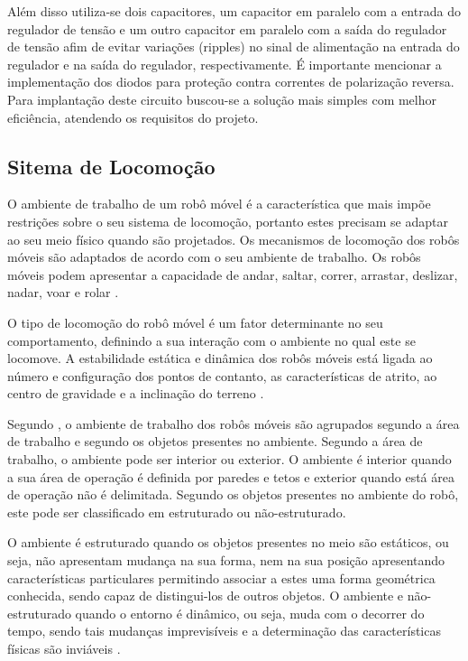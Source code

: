 Além disso utiliza-se dois capacitores, um capacitor em paralelo com a entrada do regulador de tensão e um outro capacitor em paralelo com a saída do regulador de tensão afim de evitar variações (ripples) no sinal de alimentação na entrada do regulador e na saída do regulador, respectivamente. É importante mencionar a implementação dos diodos para proteção contra correntes de polarização reversa. Para implantação deste circuito buscou-se a solução mais simples com melhor eficiência, atendendo os requisitos do projeto.

\subsection{Sitema de Locomoção}

O ambiente de trabalho de um robô móvel é a característica que mais impõe restrições sobre o seu sistema de locomoção, portanto estes
precisam se adaptar ao seu meio físico quando são projetados. Os mecanismos de locomoção dos robôs móveis são adaptados de acordo com
o seu ambiente de trabalho. Os robôs móveis podem apresentar a capacidade de andar, saltar, correr, arrastar, deslizar, nadar, voar
e rolar \cite{secchi:2008}.

O tipo de locomoção do robô móvel é um fator determinante no seu comportamento, definindo a sua interação com o ambiente no qual
este se locomove. A estabilidade estática e dinâmica dos robôs móveis está ligada ao número e configuração dos pontos de contanto,
as características de atrito, ao centro de gravidade e a inclinação do terreno \cite{silva:2010}.

Segundo , o ambiente de trabalho dos robôs móveis são agrupados segundo a área de trabalho e segundo os objetos
presentes no ambiente. Segundo a área de trabalho, o ambiente pode ser interior ou exterior. O ambiente é interior quando a sua
área de operação é definida por paredes e tetos e exterior quando está área de operação não é delimitada. Segundo os objetos
presentes no ambiente do robô, este pode ser classificado em estruturado ou não-estruturado.

O ambiente é estruturado quando os objetos presentes no meio são estáticos, ou seja, não apresentam mudança na sua forma, nem na
sua posição apresentando características particulares permitindo associar a estes uma forma geométrica conhecida, sendo capaz de
distingui-los de outros objetos. O ambiente e não-estruturado quando o entorno é dinâmico, ou seja, muda com o decorrer do
tempo, sendo tais mudanças imprevisíveis e a determinação das características físicas são inviáveis \cite{secchi:2008}.

